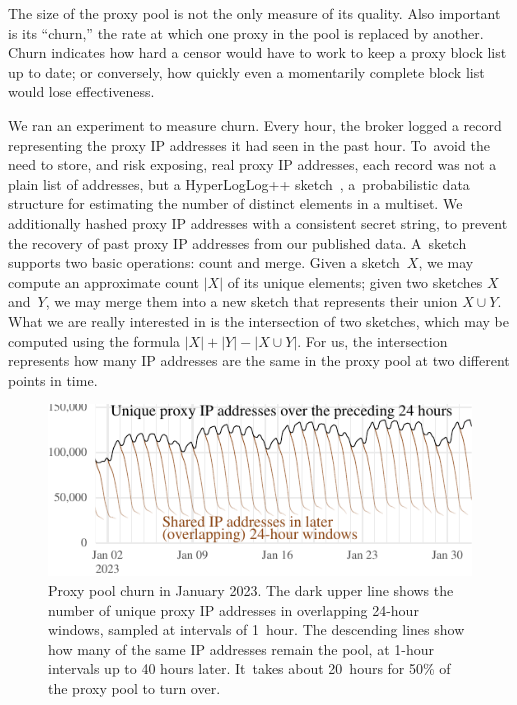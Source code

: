 \documentclass[letterpaper,twocolumn]{article}
\begin{document}

The size of the proxy pool is not the only measure of its quality.
Also important is its ``churn,'' the rate at which
one proxy in the pool is replaced by another.
Churn indicates how hard a censor would have to work
to keep a proxy block list up to date;
or conversely,
how quickly even a momentarily complete block list
would lose effectiveness.

We ran an experiment to measure churn.
Every hour, the broker logged a record representing
the proxy IP addresses it had seen in the past hour.
To~avoid the need to store, and risk exposing, real proxy IP addresses,
each record was not a plain list of addresses,
but a HyperLogLog++ sketch~\cite{Heule2013a},
a~probabilistic data structure for estimating
the number of distinct elements in a multiset.
We additionally hashed proxy IP addresses with a consistent secret string,
to prevent the recovery of past proxy IP addresses from our published data.
A~sketch supports two basic operations: count and merge.
Given a sketch~\(X\),
we may compute an approximate count \(|X|\)
of its unique elements;
given two sketches \(X\) and~\(Y\),
we may merge them into a new sketch
that represents their union \(X \cup Y\).
What we are really interested in is the intersection
of two sketches, which may be computed using the formula
\(|X| + |Y| - |X \cup Y|\).
For us, the intersection represents
how many IP addresses are the same
in the proxy pool at two different points in time.

\begin{figure}
\includegraphics{figures/proxy-churn/proxy-count-decay}
\caption{
Proxy pool churn in January 2023.
The dark upper line shows the number
of unique proxy IP addresses in overlapping 24-hour windows,
sampled at intervals of 1~hour.
The descending lines show
how many of the same IP addresses remain the pool,
at 1-hour intervals up to 40 hours later.
It~takes about 20~hours for 50\% of the proxy pool to turn over.
}
\label{fig:proxy-count-decay}
\end{figure}
\end{document}
